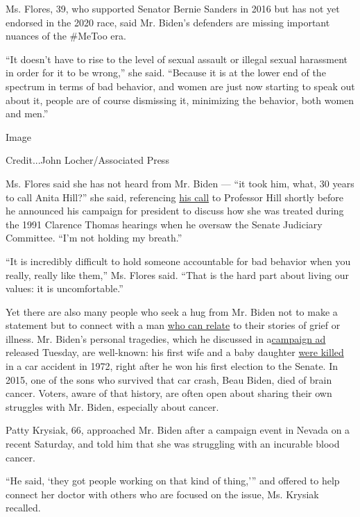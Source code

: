 Ms. Flores, 39, who supported Senator Bernie Sanders in 2016 but has not
yet endorsed in the 2020 race, said Mr. Biden's defenders are missing
important nuances of the \#MeToo era.

``It doesn't have to rise to the level of sexual assault or illegal
sexual harassment in order for it to be wrong,'' she said. ``Because it
is at the lower end of the spectrum in terms of bad behavior, and women
are just now starting to speak out about it, people are of course
dismissing it, minimizing the behavior, both women and men.''

Image

Credit...John Locher/Associated Press

Ms. Flores said she has not heard from Mr. Biden --- ``it took him,
what, 30 years to call Anita Hill?'' she said, referencing
\href{https://www.nytimes.com/2019/04/25/us/politics/joe-biden-anita-hill.html}{his
call} to Professor Hill shortly before he announced his campaign for
president to discuss how she was treated during the 1991 Clarence Thomas
hearings when he oversaw the Senate Judiciary Committee. ``I'm not
holding my breath.''

``It is incredibly difficult to hold someone accountable for bad
behavior when you really, really like them,'' Ms. Flores said. ``That is
the hard part about living our values: it is uncomfortable.''

Yet there are also many people who seek a hug from Mr. Biden not to make
a statement but to connect with a man
\href{https://www.nytimes.com/2019/05/30/us/politics/joe-biden-beau-biden-death.html}{who
can relate} to their stories of grief or illness. Mr. Biden's personal
tragedies, which he discussed in
a\href{https://www.nytimes.com/2019/08/27/us/politics/joe-biden-ad-personal.html}{campaign
ad} released Tuesday, are well-known: his first wife and a baby daughter
\href{https://www.nytimes.com/1972/12/19/archives/bidens-wife-child-killed-in-car-crash.html}{were
killed} in a car accident in 1972, right after he won his first election
to the Senate. In 2015, one of the sons who survived that car crash,
Beau Biden, died of brain cancer. Voters, aware of that history, are
often open about sharing their own struggles with Mr. Biden, especially
about cancer.

Patty Krysiak, 66, approached Mr. Biden after a campaign event in Nevada
on a recent Saturday, and told him that she was struggling with an
incurable blood cancer.

``He said, `they got people working on that kind of thing,''' and
offered to help connect her doctor with others who are focused on the
issue, Ms. Krysiak recalled.

